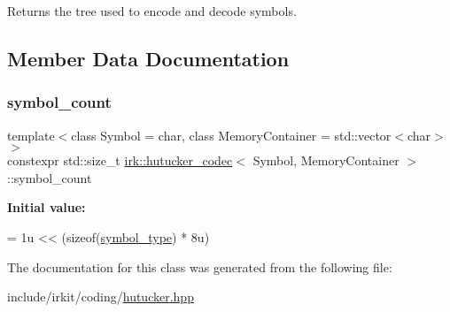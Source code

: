 Returns the tree used to encode and decode symbols. 



\subsection{Member Data Documentation}
\mbox{\label{classirk_1_1hutucker__codec_a4b583dcfd72280bb0178cd8cf2845e34}} 
\subsubsection{\texorpdfstring{symbol\+\_\+count}{symbol\_count}}
{\footnotesize\ttfamily template$<$class Symbol = char, class Memory\+Container = std\+::vector$<$char$>$$>$ \\
constexpr std\+::size\+\_\+t \mbox{\hyperlink{classirk_1_1hutucker__codec}{irk\+::hutucker\+\_\+codec}}$<$ Symbol, Memory\+Container $>$\+::symbol\+\_\+count\hspace{0.3cm}{\ttfamily [static]}}

{\bfseries Initial value\+:}
\begin{DoxyCode}
= 1u
        << (\textcolor{keyword}{sizeof}(\mbox{\hyperlink{classirk_1_1hutucker__codec_af23dee5959ae2a69eea0ab324cf6ecb6}{symbol\_type}}) * 8u)
\end{DoxyCode}


The documentation for this class was generated from the following file\+:\begin{DoxyCompactItemize}
\item 
include/irkit/coding/\mbox{\hyperlink{hutucker_8hpp}{hutucker.\+hpp}}\end{DoxyCompactItemize}
